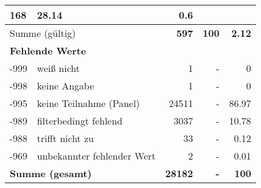 \begin{longtable}{lXrrr}
       \num{168} &
       \num[round-mode=places,round-precision=2]{28.14} &
         \num[round-mode=places,round-precision=2]{0.6} \\
     \midrule
     \multicolumn{2}{l}{Summe (gültig)} &
       \textbf{\num{597}} &
     \textbf{\num{100}} &
       \textbf{\num[round-mode=places,round-precision=2]{2.12}} \\
     \multicolumn{5}{l}{\textbf{Fehlende Werte}}\\
       -999 &
       weiß nicht &
         \num{1} &
        - &
         \num[round-mode=places,round-precision=2]{0} \\
       -998 &
       keine Angabe &
         \num{1} &
        - &
         \num[round-mode=places,round-precision=2]{0} \\
       -995 &
       keine Teilnahme (Panel) &
         \num{24511} &
        - &
         \num[round-mode=places,round-precision=2]{86.97} \\
       -989 &
       filterbedingt fehlend &
         \num{3037} &
        - &
         \num[round-mode=places,round-precision=2]{10.78} \\
       -988 &
       trifft nicht zu &
         \num{33} &
        - &
         \num[round-mode=places,round-precision=2]{0.12} \\
       -969 &
       unbekannter fehlender Wert &
         \num{2} &
        - &
         \num[round-mode=places,round-precision=2]{0.01} \\
     \midrule
     \multicolumn{2}{l}{\textbf{Summe (gesamt)}} &
          \textbf{\num{28182}} &
        \textbf{-} &
        \textbf{\num{100}} \\
     \bottomrule
     \end{longtable}
     
